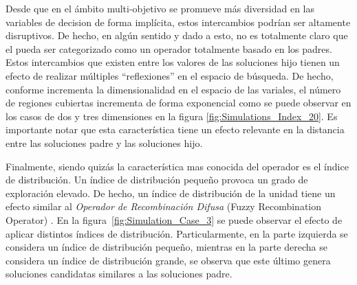 %
Desde que en el ámbito multi-objetivo se promueve más diversidad en las variables de decision de forma implícita, estos intercambios podrían ser altamente disruptivos.
%
De hecho, en algún sentido y dado a esto, no es totalmente claro que el \SBX{} pueda ser categorizado como un operador totalmente basado en los padres.
%
Estos intercambios que existen entre los valores de las soluciones hijo tienen un efecto de realizar múltiples ``reflexiones'' en el espacio de búsqueda.
%
De hecho, conforme incrementa la dimensionalidad en el espacio de las variales, el número de regiones cubiertas incrementa de forma exponencial como se puede observar en los casos de dos y tres dimensiones en la figura \ref{fig:Simulations_Index_20}.
%
Es importante notar que esta característica tiene un efecto relevante en la distancia entre las soluciones padre y las soluciones hijo.

Finalmente, siendo quizás la característica mas conocida del operador \SBX{} es el índice de distribución.
%
Un índice de distribución pequeño provoca un grado de exploración elevado.
%
De hecho, un índice de distribución de la unidad tiene un efecto similar al \textit{Operador de Recombinación Difusa} (Fuzzy Recombination Operator) \cite{voigt1995fuzzy}.
%
En la figura~\ref{fig:Simulation_Case_3} se puede observar el efecto de aplicar distintos índices de distribución.
%
Particularmente, en la parte izquierda se considera un índice de distribución pequeño, mientras en la parte derecha se considera un índice de distribución grande, se observa que este último genera soluciones candidatas similares a las soluciones padre.
%

